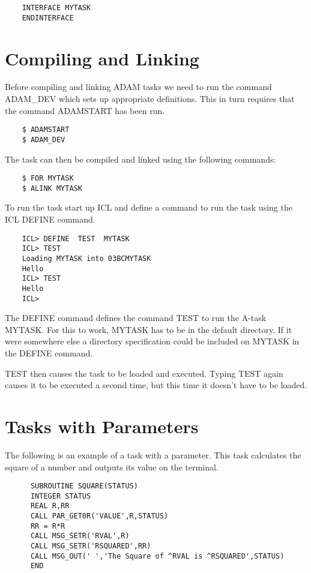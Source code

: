 \begin{verbatim}
    INTERFACE MYTASK
    ENDINTERFACE
\end{verbatim}      

\section{Compiling and Linking}

Before compiling and linking ADAM tasks we need to run the command ADAM\_DEV
which sets up appropriate definitions. This in turn requires
that the command ADAMSTART has been run.

\begin{verbatim}
    $ ADAMSTART
    $ ADAM_DEV
\end{verbatim}

The task can then be compiled and linked using the following commands:

\begin{verbatim}
    $ FOR MYTASK
    $ ALINK MYTASK
\end{verbatim}

To run the task start up ICL and define a command to run the task using
the ICL DEFINE command.

\begin{verbatim}
    ICL> DEFINE  TEST  MYTASK
    ICL> TEST
    Loading MYTASK into 03BCMYTASK
    Hello
    ICL> TEST
    Hello
    ICL>
\end{verbatim}
The DEFINE command defines the command TEST to run the A-task MYTASK. For
this to work, MYTASK has to be in the default directory. If it were somewhere
else a directory specification could be included on MYTASK in the DEFINE
command.

TEST then causes the task to be loaded and executed. Typing TEST again causes
it to be executed a second time, but this time it doesn't have to be loaded.
                                                                        
\section{Tasks with Parameters}

The following is an example of a task with a parameter. This task calculates
the square of a number and outputs its value on the terminal.

\begin{verbatim}
      SUBROUTINE SQUARE(STATUS)
      INTEGER STATUS
      REAL R,RR
      CALL PAR_GET0R('VALUE',R,STATUS)
      RR = R*R           
      CALL MSG_SETR('RVAL',R)
      CALL MSG_SETR('RSQUARED',RR)
      CALL MSG_OUT(' ','The Square of ^RVAL is ^RSQUARED',STATUS)
      END
\end{verbatim}                                               

